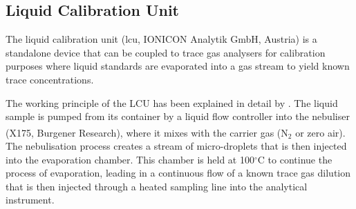 

































\subsection{Liquid Calibration Unit}\label{section:lcu}
The liquid calibration unit (\acrshort{lcu}, IONICON Analytik GmbH, Austria) %
is a standalone device that can be coupled to trace gas analysers for calibration purposes
where liquid standards are evaporated into a gas stream to yield known trace concentrations. %

The working principle of the LCU  has been explained in detail by \citeauthor{fischerlcu} \cite{fischerlcu}.
%
The  liquid sample is pumped from its container by a liquid flow controller into the nebuliser (X175, Burgener Research\textsuperscript{\textregistered}), where it mixes with the carrier gas (N$_2$ or zero air).
%
The nebulisation process creates a stream of micro-droplets that is then injected into the evaporation chamber.
%
This chamber is held at 100$^{\circ}$C to continue the process of evaporation, leading in a continuous flow of a known trace gas dilution that is then injected through a heated sampling line into the analytical instrument.

